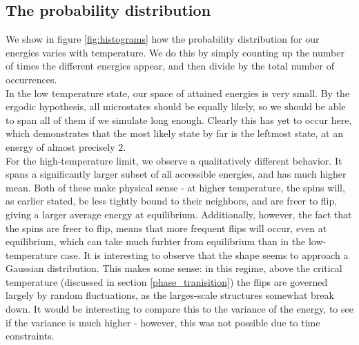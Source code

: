 \documentclass[a4paper, 10pt]{article}
\begin{document}
\subsection{The probability distribution}
We show in figure \ref{fig:histograms} how the probability distribution for our energies varies with temperature. We do this by simply counting up the number of times the different energies appear, and then divide by the total number of occurrences.\\
\linebreak
In the low temperature state, our space of attained energies is very small. By the ergodic hypothesis, all microstates should be equally likely, so we should be able to span all of them if we simulate long enough. Clearly this has yet to occur here, which demonstrates that the most likely state by far is the leftmost state, at an energy of almost precisely 2.\\
\linebreak
For the high-temperature limit, we observe a qualitatively different behavior. It spans a significantly larger subset of all accessible energies, and has  much higher mean. Both of these make physical sense - at higher temperature, the spins will, as earlier stated, be less tightly bound to their neighbors, and are freer to flip, giving a larger average energy at equilibrium. Additionally, however, the fact that the spins are freer to flip, means that more frequent flips will occur, even at equilibrium, which can take much furhter from equilibrium than in the low-temperature case. It is interesting to observe that the shape seems to approach a Gaussian distribution. This makes some sense: in this regime, above the critical temperature (discussed in section \ref{phase_tranisition}) the flips are governed largely by random fluctuations, as the larges-scale structures somewhat break down. It would be interesting to compare this to the variance of the energy, to see if the variance is much higher - however, this was not possible due to time constraints.
\end{document}
